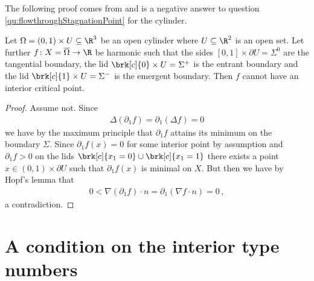 The following proof comes from \cite{Wahlen2023} and is a negative answer to question \ref{qu:flowthroughStagnationPoint}
for the cylinder.
\begin{proposition}\label{pr:n3_inflowOutflowCylinder}
  Let $\Omega=(0,1)\times U\subseteq\R^3$ be an open cylinder where $U\subseteq\R^2$ is an open set.
  Let further $f\colon X=\overline{\Omega}\to\R$ be
  harmonic such that the sides
  $[0,1]\times \partial U=\Sigma^0$ are the tangential boundary,
  the lid $\brk[c]{0}\times U=\Sigma^+$ is the entrant boundary and
  the lid $\brk[c]{1}\times U=\Sigma^-$ is the emergent boundary. 
  Then $f$ cannot have an interior critical point.
\end{proposition}
\begin{proof}
  Assume not. Since
  \begin{align*}
    \Delta(\partial_1f)=\partial_1(\Delta f)=0
  \end{align*}
  we have by the maximum principle that $\partial_1 f$ attains its minimum on the boundary $\Sigma$. Since $\partial_1 f(x)=0$ for some interior point 
  by assumption and $\partial_1 f>0$ on the lids $\brk[c]{x_1=0}\cup\brk[c]{x_1=1}$ there exists a point
  $x\in(0,1)\times \partial U$ such that $\partial_1f(x)$ is minimal on $X$. But then we have by Hopf's lemma
  that
  \begin{align*}
    0<\nabla (\partial_1f)\cdot n=\partial_1(\nabla f\cdot n)=0\,,
  \end{align*}
  a contradiction.
\end{proof}

\section{A condition on the interior type numbers}

